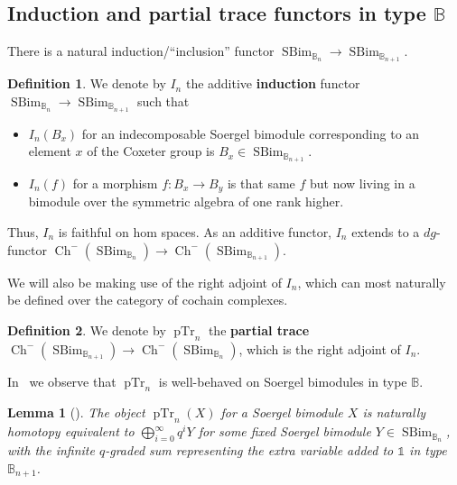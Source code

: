 \documentclass[11pt]{article}
\DeclareMathOperator{\Ch}{Ch}
\DeclareMathOperator{\SBim}{SBim}
\DeclareMathOperator{\pTr}{pTr}
\newtheorem{lemma}[thm]{Lemma}
\theoremstyle{definition}
\newtheorem{definition}{Definition}[section]
\theoremstyle{remark}
\numberwithin{equation}{section}
\begin{document}
\subsection{Induction and partial trace functors in type $\mathbb{B}$}
There is a natural induction/``inclusion'' functor $\SBim_{\mathbb{B}_n}\to \SBim_{\mathbb{B}_{n+1}}$.
\begin{definition}
	\label{def:inductionfunctor}
	We denote by $I_n$ the additive \textbf{induction} functor
	$\SBim_{\mathbb{B}_n}\to \SBim_{\mathbb{B}_{n+1}}$ such that
	\begin{itemize}
		\item $I_n(B_x)$ for an
			indecomposable Soergel bimodule corresponding
			to an element $x$ of the Coxeter group is
			$B_x\in\SBim_{\mathbb{B}_{n+1}}$.
		\item $I_n(f)$ for a morphism $f:B_x\to B_y$ is
			that same $f$ but now living in a bimodule over
			the symmetric algebra of one rank higher.
	\end{itemize}
	Thus, $I_n$ is faithful on hom spaces.
As an additive functor, $I_n$ extends to a $dg$-functor
$\Ch^-(\SBim_{\mathbb{B}_{n}})\to \Ch^-(\SBim_{\mathbb{B}_{n+1}})$.
\end{definition}
\noindent We will also be making use of the right adjoint of $I_n$, which can most
naturally be defined over the category of cochain complexes.
\begin{definition}
	\label{def:partialtrace}
	We denote by $\pTr_n$ the \textbf{partial trace}
	$\Ch^-(\SBim_{\mathbb{B}_{n+1}})\to \Ch^-(\SBim_{\mathbb{B}_n})$, which is the
	right adjoint of $I_n$.
\end{definition}
\noindent In~\cite{cataltepe_partial_2026} we observe that
$\pTr_n$
is well-behaved on Soergel bimodules in type $\mathbb{B}$.
\begin{lemma}[\cite{cataltepe_partial_2026}]
	\label{lem:partialtrace}
	The object $\pTr_{n}(X)$ for a Soergel
	bimodule $X$ is naturally homotopy
	equivalent to $\bigoplus_{i=0}^\infty q^i Y$ for some fixed
	Soergel bimodule $Y\in \SBim_{\mathbb{B}_n}$, with the infinite $q$-graded
	sum representing the extra variable added to $\mathbb{1}$ in type
	$\mathbb{B}_{n+1}$.
\end{lemma}
\end{document}
